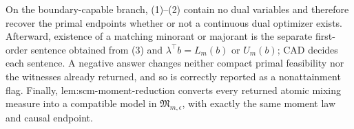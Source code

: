 On the boundary-capable branch, (1)--(2) contain no dual variables and therefore recover the primal endpoints whether or not a continuous dual optimizer exists.  Afterward, existence of a matching minorant or majorant is the separate first-order sentence obtained from (3) and \(\lambda^{\top}b=L_m(b)\) or \(U_m(b)\); CAD decides each sentence.  A negative answer changes neither compact primal feasibility nor the witnesses already returned, and so is correctly reported as a nonattainment flag.  Finally, lem:scm-moment-reduction converts every returned atomic mixing measure into a compatible model in \(\mathfrak M_{m,\epsilon}\), with exactly the same moment law and causal endpoint.
